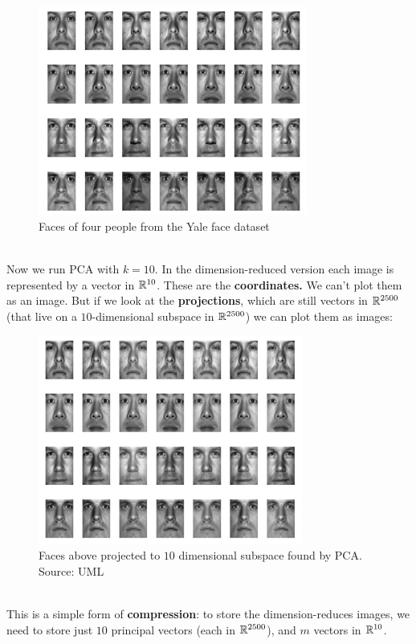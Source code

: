 \begin{figure}[H]
      \centering
      \includegraphics[height=2.7in]{pca_faces_before.jpeg}        
      \caption{Faces of four people from the Yale face dataset}
    \end{figure}
~\\
    Now we run PCA with $k=10$. In the dimension-reduced version
    each image is represented by a vector in $\mathbb{R}^{10}$. These are the {\bf
    coordinates.} We can't plot them as an image. But if we look at the {\bf
    projections}, which are still vectors in $\mathbb{R}^{2500}$ (that live on a
    $10$-dimensional subspace in $\mathbb{R}^{2500}$) we can plot them as images:
\begin{figure}[H]
      \centering
      \includegraphics[height=2.7in]{pca_faces_after.jpeg}        
      \caption{Faces above projected to $10$ dimensional subspace found by PCA.
      Source: UML}
    \end{figure}
~\\
This is a simple form of {\bf compression}: to store the dimension-reduces
images, we need to store just $10$ principal vectors 
(each in $\mathbb{R}^{2500}$), and $m$ vectors in $\mathbb{R}^{10}$.
\\~\\
